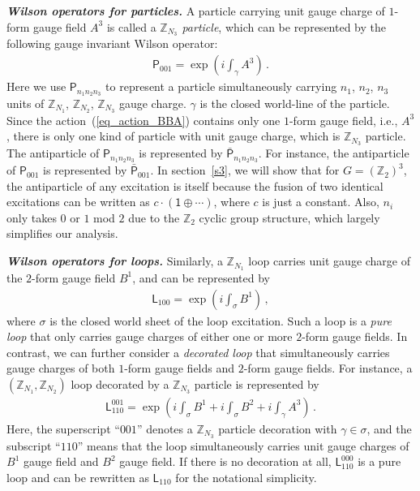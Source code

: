 \documentclass[11pt,nofootinbib,preprint]{revtex4-1}
\begin{document}
\textbf{\textit{Wilson operators for particles.}} 
 A particle carrying  unit gauge charge of $1$-form gauge field $A^3$ is called a \textit{$\mathbb{Z} _{N_3}$ particle}, which can be represented by the following gauge invariant Wilson operator:
\begin{align}
	\mathsf{P}_{001}=\exp \left( i\int_{\gamma}{A^3} \right) \,.
\end{align}
Here we use $\mathsf{P}_{n_{1}n_{2}n_{3}}$ to represent a particle simultaneously carrying $n_{1}$, $n_{2}$, $n_{3}$ units of $\mathbb{Z} _{N_1}$, $\mathbb{Z} _{N_2}$, $\mathbb{Z} _{N_3}$ gauge charge. $\gamma$ is the closed world-line of the particle. Since  the action~(\ref{eq_action_BBA}) contains only one $1$-form gauge field, i.e., $A^3$, there is only one kind of particle with unit gauge charge, which is $\mathbb{Z} _{N_3}$ particle. The antiparticle of $\mathsf{P}_{n_{1}n_{2}n_{3}}$ is represented by $\bar{\mathsf{P}}_{n_{1}n_{2}n_{3}}$. For instance, the antiparticle of $\mathsf{P}_{001}$ is represented by $\bar{\mathsf{P}}_{001}$. 
In section~\ref{s3}, we will show that for $G=\left(\mathbb{Z} _{2}\right)^{3}$, the antiparticle of any excitation is itself because the fusion of two identical excitations can be written as $c\cdot\left(\mathsf{1}\oplus\cdots\right)$, where $c$ is just a constant. Also, $n_{i}$ only takes $0$ or $1$ mod $2$ due to the $\mathbb{Z} _{2}$ cyclic group structure, which largely simplifies our analysis.

\textbf{\textit{Wilson operators for loops.}}
Similarly,  a $\mathbb{Z} _{N_1}$ loop carries unit gauge charge of the $2$-form gauge field $B^1$, and can be represented by
\begin{align}
	\mathsf{L}_{100}=\exp \left( i\int_{\sigma}{B^1} \right)\,,
\end{align}
where $\sigma$ is the closed world sheet of the loop excitation.  Such a loop is a \textit{pure loop} that only carries gauge charges of  either one or more $2$-form gauge fields.  In contrast, we can  further  consider a \textit{decorated loop} that simultaneously carries gauge charges of both $1$-form gauge fields and $2$-form gauge fields. For instance, a $\left( \mathbb{Z} _{N_1},\mathbb{Z} _{N_2} \right)$ loop decorated by a $\mathbb{Z} _{N_3}$ particle is represented by
\begin{align}
	\mathsf{L}_{110}^{001}=\exp \left( i\int_{\sigma}{B^1}+i\int_{\sigma}{B^2}+i\int_{\gamma}{A^3} \right)\,.
\end{align}
Here, the superscript ``$001$'' denotes a $\mathbb{Z} _{N_3}$ particle decoration with $\gamma\in \sigma$, and the subscript ``$110$'' means that the loop simultaneously carries unit gauge charges of $B^1$ gauge field and  $B^2$ gauge field. If there is no decoration at all, $\mathsf{L}_{110}^{000}$ is a pure loop and can be rewritten as $\mathsf{L}_{110}$ for the notational simplicity.
\end{document}

